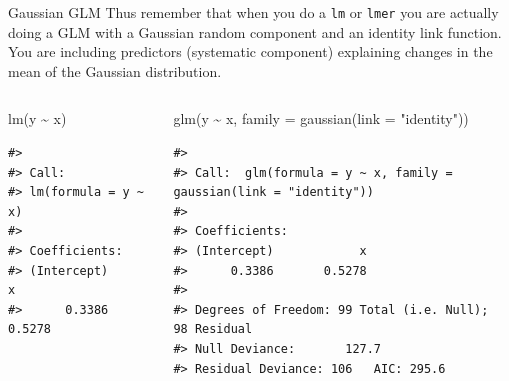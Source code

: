 \documentclass[
  ignorenonframetext,
]{beamer}
\newenvironment{Shaded}{\begin{snugshade}}{\end{snugshade}}
\newcommand{\AttributeTok}[1]{\textcolor[rgb]{0.40,0.45,0.13}{#1}}
\newcommand{\FunctionTok}[1]{\textcolor[rgb]{0.28,0.35,0.67}{#1}}
\newcommand{\NormalTok}[1]{\textcolor[rgb]{0.00,0.23,0.31}{#1}}
\newcommand{\SpecialCharTok}[1]{\textcolor[rgb]{0.37,0.37,0.37}{#1}}
\newcommand{\StringTok}[1]{\textcolor[rgb]{0.13,0.47,0.30}{#1}}
\begin{document}
\begin{frame}[fragile]{Gaussian GLM}
\label{gaussian-glm}
Thus remember that when you do a \texttt{lm} or \texttt{lmer} you are
actually doing a GLM with a Gaussian random component and an identity
link function. You are including predictors (systematic component)
explaining changes in the mean of the Gaussian distribution.

\begin{columns}[T]
\begin{column}{0.48\linewidth}
\begin{Shaded}
\begin{Highlighting}[]
\FunctionTok{lm}\NormalTok{(y }\SpecialCharTok{\textasciitilde{}}\NormalTok{ x)}
\end{Highlighting}
\end{Shaded}

\begin{verbatim}
#> 
#> Call:
#> lm(formula = y ~ x)
#> 
#> Coefficients:
#> (Intercept)            x  
#>      0.3386       0.5278
\end{verbatim}
\end{column}

\begin{column}{0.48\linewidth}
\begin{Shaded}
\begin{Highlighting}[]
\FunctionTok{glm}\NormalTok{(y }\SpecialCharTok{\textasciitilde{}}\NormalTok{ x, }\AttributeTok{family =} \FunctionTok{gaussian}\NormalTok{(}\AttributeTok{link =} \StringTok{"identity"}\NormalTok{))}
\end{Highlighting}
\end{Shaded}

\begin{verbatim}
#> 
#> Call:  glm(formula = y ~ x, family = gaussian(link = "identity"))
#> 
#> Coefficients:
#> (Intercept)            x  
#>      0.3386       0.5278  
#> 
#> Degrees of Freedom: 99 Total (i.e. Null);  98 Residual
#> Null Deviance:       127.7 
#> Residual Deviance: 106   AIC: 295.6
\end{verbatim}
\end{column}
\end{columns}
\end{frame}
\end{document}
